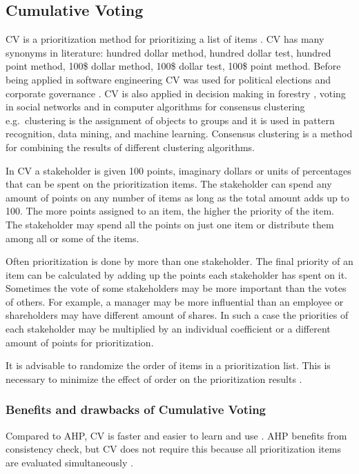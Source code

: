 

\subsection{Cumulative Voting\label{app:CV}}

CV is a prioritization method for prioritizing a list of items \citep{Leffingwell1999}.
CV has many synonyms in literature: hundred dollar method, hundred
dollar test, hundred point method, 100\$ dollar method, 100\$ dollar
test, 100\$ point method.
Before being applied in software engineering CV was used for
political elections \citep{Engstrom1999} and corporate governance
\citep{Bhagat1984}. CV is also applied in decision making in forestry
\citep{Hiltunen2008}, voting in social networks \citep{Boldi:2009:VSN:1645953.1646052} and in computer algorithms for consensus clustering \citep{Ayad2008b} e.g.\ clustering is the assignment of objects to groups and it is used in pattern recognition, data mining, and machine learning. Consensus clustering is a method for combining the results of different clustering algorithms.

In CV a stakeholder is given 100 points,
imaginary dollars or units of percentages that can be spent on the prioritization
items. The stakeholder can spend any amount of points on any number
of items as long as the total amount adds up to 100. The more points
assigned to an item, the higher the priority of the item. The
stakeholder may spend all the points on just one item or distribute
them among all or some of the items.

Often prioritization is done by more than one stakeholder. The final
priority of an item can be calculated by adding up the points each stakeholder
has spent on it. Sometimes the vote of some stakeholders may be more
important than the votes of others. For example, a manager may be
more influential than an employee or shareholders may have different
amount of shares. In such a case the priorities of each stakeholder
may be multiplied by an individual coefficient or a different amount of 
points for prioritization.

It is advisable to randomize the order of items in a prioritization
list. This is necessary to minimize the effect of order on the prioritization
results \citep{Svahnberg2009}.

\subsubsection{Benefits and drawbacks of Cumulative Voting}
Compared to AHP, CV is faster and easier to learn and use \citep{Berander2005,Ahl2005}.
AHP benefits from consistency check, but CV does not require this because
all prioritization items are evaluated simultaneously \citep{Ahl2005}.

